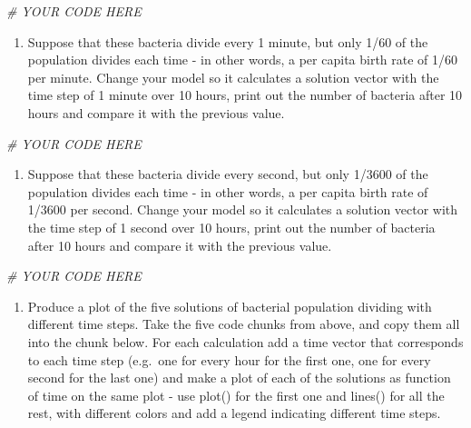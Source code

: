 \documentclass[
]{book}
\newenvironment{Shaded}{\begin{snugshade}}{\end{snugshade}}
\newcommand{\CommentTok}[1]{\textcolor[rgb]{0.56,0.35,0.01}{\textit{#1}}}
\providecommand{\tightlist}{%
  \setlength{\itemsep}{0pt}\setlength{\parskip}{0pt}}
\theoremstyle{definition}
\theoremstyle{definition}
\theoremstyle{definition}
\theoremstyle{remark}
\begin{document}
\begin{Shaded}
\begin{Highlighting}[]
\CommentTok{\# YOUR CODE HERE}
\end{Highlighting}
\end{Shaded}

\begin{enumerate}
\def\labelenumi{\arabic{enumi}.}
\setcounter{enumi}{3}
\tightlist
\item
  Suppose that these bacteria divide every 1 minute, but only 1/60 of the population divides each time - in other words, a per capita birth rate of 1/60 per minute. Change your model so it calculates a solution vector with the time step of 1 minute over 10 hours, print out the number of bacteria after 10 hours and compare it with the previous value.
\end{enumerate}

\begin{Shaded}
\begin{Highlighting}[]
\CommentTok{\# YOUR CODE HERE}
\end{Highlighting}
\end{Shaded}

\begin{enumerate}
\def\labelenumi{\arabic{enumi}.}
\setcounter{enumi}{4}
\tightlist
\item
  Suppose that these bacteria divide every second, but only 1/3600 of the population divides each time - in other words, a per capita birth rate of 1/3600 per second. Change your model so it calculates a solution vector with the time step of 1 second over 10 hours, print out the number of bacteria after 10 hours and compare it with the previous value.
\end{enumerate}

\begin{Shaded}
\begin{Highlighting}[]
\CommentTok{\# YOUR CODE HERE}
\end{Highlighting}
\end{Shaded}

\begin{enumerate}
\def\labelenumi{\arabic{enumi}.}
\setcounter{enumi}{5}
\tightlist
\item
  Produce a plot of the five solutions of bacterial population dividing with different time steps. Take the five code chunks from above, and copy them all into the chunk below. For each calculation add a time vector that corresponds to each time step (e.g.~one for every hour for the first one, one for every second for the last one) and make a plot of each of the solutions as function of time on the same plot - use plot() for the first one and lines() for all the rest, with different colors and add a legend indicating different time steps.
\end{enumerate}
\end{document}

